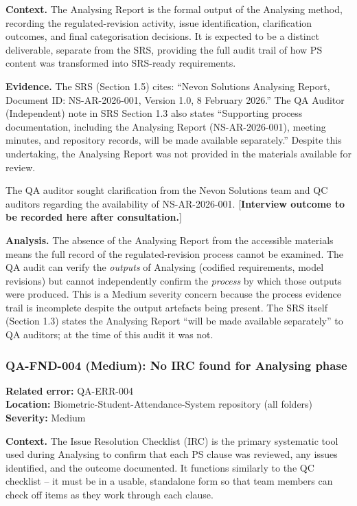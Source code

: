 \documentclass[11pt,a4paper]{article}
\begin{document}
\textbf{Context.}
The Analysing Report is the formal output of the Analysing method, recording the regulated-revision activity, issue identification, clarification outcomes, and final categorisation decisions. It is expected to be a distinct deliverable, separate from the SRS, providing the full audit trail of how PS content was transformed into SRS-ready requirements.

\textbf{Evidence.}
The SRS (Section 1.5) cites: ``Nevon Solutions Analysing Report, Document ID: NS-AR-2026-001, Version 1.0, 8 February 2026.'' The QA Auditor (Independent) note in SRS Section 1.3 also states ``Supporting process documentation, including the Analysing Report (NS-AR-2026-001), meeting minutes, and repository records, will be made available separately.'' Despite this undertaking, the Analysing Report was not provided in the materials available for review.

The QA auditor sought clarification from the Nevon Solutions team and QC auditors regarding the availability of NS-AR-2026-001. [\textbf{Interview outcome to be recorded here after consultation.}]

\textbf{Analysis.}
The absence of the Analysing Report from the accessible materials means the full record of the regulated-revision process cannot be examined. The QA audit can verify the \textit{outputs} of Analysing (codified requirements, model revisions) but cannot independently confirm the \textit{process} by which those outputs were produced. This is a Medium severity concern because the process evidence trail is incomplete despite the output artefacts being present. The SRS itself (Section 1.3) states the Analysing Report ``will be made available separately'' to QA auditors; at the time of this audit it was not.

\subsubsection*{QA-FND-004 (Medium): No IRC found for Analysing phase}

\textbf{Related error:} QA-ERR-004 \\
\textbf{Location:} Biometric-Student-Attendance-System repository (all folders) \\
\textbf{Severity:} Medium

\textbf{Context.}
The Issue Resolution Checklist (IRC) is the primary systematic tool used during Analysing to confirm that each PS clause was reviewed, any issues identified, and the outcome documented. It functions similarly to the QC checklist -- it must be in a usable, standalone form so that team members can check off items as they work through each clause.
\end{document}
